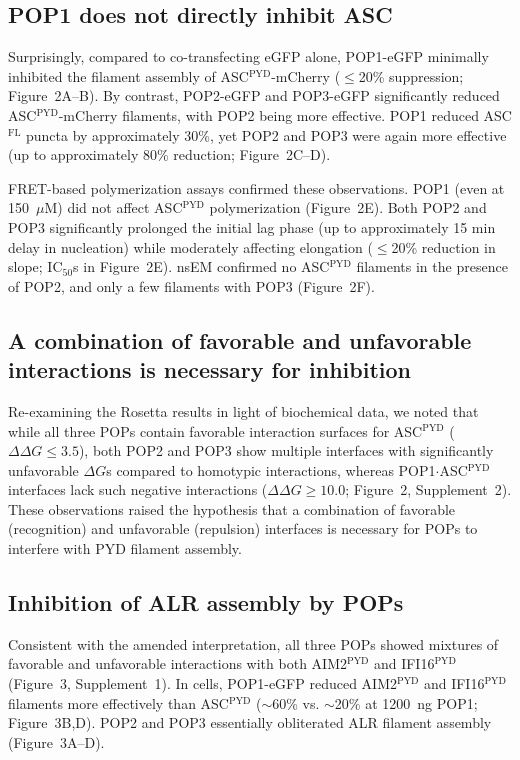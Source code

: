 \documentclass[11pt]{article}
\begin{document}
\subsection{POP1 does not directly inhibit ASC}

Surprisingly, compared to co-transfecting eGFP alone, POP1-eGFP minimally inhibited the filament assembly of ASC$^{\text{PYD}}$-mCherry ($\leq$20\% suppression; Figure~2A--B). By contrast, POP2-eGFP and POP3-eGFP significantly reduced ASC$^{\text{PYD}}$-mCherry filaments, with POP2 being more effective. POP1 reduced ASC$^{\text{FL}}$ puncta by approximately 30\%, yet POP2 and POP3 were again more effective (up to approximately 80\% reduction; Figure~2C--D).

FRET-based polymerization assays confirmed these observations. POP1 (even at 150~$\mu$M) did not affect ASC$^{\text{PYD}}$ polymerization (Figure~2E). Both POP2 and POP3 significantly prolonged the initial lag phase (up to approximately 15 min delay in nucleation) while moderately affecting elongation ($\leq$20\% reduction in slope; IC$_{50}$s in Figure~2E). nsEM confirmed no ASC$^{\text{PYD}}$ filaments in the presence of POP2, and only a few filaments with POP3 (Figure~2F).

\subsection{A combination of favorable and unfavorable interactions is necessary for inhibition}

Re-examining the Rosetta results in light of biochemical data, we noted that while all three POPs contain favorable interaction surfaces for ASC$^{\text{PYD}}$ ($\Delta\Delta G \leq 3.5$), both POP2 and POP3 show multiple interfaces with significantly unfavorable $\Delta G$s compared to homotypic interactions, whereas POP1$\cdot$ASC$^{\text{PYD}}$ interfaces lack such negative interactions ($\Delta\Delta G \geq 10.0$; Figure~2, Supplement~2). These observations raised the hypothesis that a combination of favorable (recognition) and unfavorable (repulsion) interfaces is necessary for POPs to interfere with PYD filament assembly.

\subsection{Inhibition of ALR assembly by POPs}

Consistent with the amended interpretation, all three POPs showed mixtures of favorable and unfavorable interactions with both AIM2$^{\text{PYD}}$ and IFI16$^{\text{PYD}}$ (Figure~3, Supplement~1). In cells, POP1-eGFP reduced AIM2$^{\text{PYD}}$ and IFI16$^{\text{PYD}}$ filaments more effectively than ASC$^{\text{PYD}}$ ($\sim$60\% vs. $\sim$20\% at 1200~ng POP1; Figure~3B,D). POP2 and POP3 essentially obliterated ALR filament assembly (Figure~3A--D).
\end{document}
